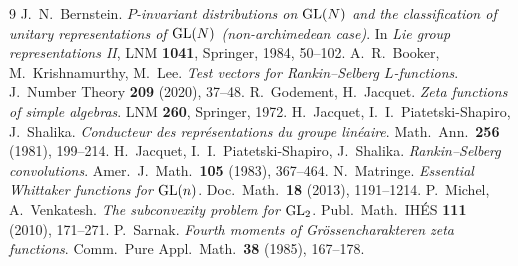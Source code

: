 \begin{thebibliography}{9}
 J.~N.~Bernstein.
  \emph{$P$-invariant distributions on $\mathrm{GL}(N)$ and the classification of
  unitary representations of $\mathrm{GL}(N)$ (non-archimedean case)}. In
  \emph{Lie group representations II}, LNM \textbf{1041}, Springer, 1984,
  50--102.
 A.~R.~Booker, M.~Krishnamurthy, M.~Lee.
  \emph{Test vectors for Rankin--Selberg $L$-functions}.
  J.\ Number Theory \textbf{209} (2020), 37--48.
 R.~Godement, H.~Jacquet.
  \emph{Zeta functions of simple algebras}. LNM \textbf{260}, Springer, 1972.
 H.~Jacquet, I.~I.~Piatetski-Shapiro, J.~Shalika.
  \emph{Conducteur des repr\'esentations du groupe lin\'eaire}.
  Math.\ Ann.\ \textbf{256} (1981), 199--214.
 H.~Jacquet, I.~I.~Piatetski-Shapiro, J.~Shalika.
  \emph{Rankin--Selberg convolutions}.
  Amer.\ J.\ Math.\ \textbf{105} (1983), 367--464.
 N.~Matringe.
  \emph{Essential Whittaker functions for $\mathrm{GL}(n)$}.
  Doc.\ Math.\ \textbf{18} (2013), 1191--1214.
 P.~Michel, A.~Venkatesh.
  \emph{The subconvexity problem for $\mathrm{GL}_2$}.
  Publ.\ Math.\ IH\'ES \textbf{111} (2010), 171--271.
 P.~Sarnak.
  \emph{Fourth moments of Gr\"ossencharakteren zeta functions}.
  Comm.\ Pure Appl.\ Math.\ \textbf{38} (1985), 167--178.
\end{thebibliography}

\endgroup

\endgroup
